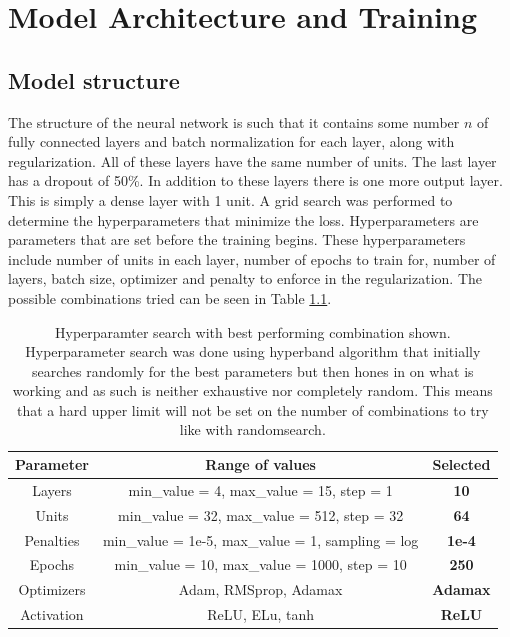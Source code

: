 
\chapter{Model Architecture and Training}

\label{Chapter3}

\section{Model structure}
The structure of the neural network is such that it contains some number $n$ of fully connected layers and batch normalization for each layer, along with regularization. All of these layers have the same number of units. The last layer has a dropout of 50\%. In addition to these layers there is one more output layer. This is simply a dense layer with 1 unit. A grid search was performed to determine the hyperparameters that minimize the loss. Hyperparameters are parameters that are set before the training begins\cite{hyperparameters_definition}. These hyperparameters include number of units in each layer, number of epochs to train for, number of layers, batch size, optimizer and penalty to enforce in the regularization. The possible combinations tried can be seen in Table \ref{table:gridSearchHyperparamters}.

\begin{table}[h]
    \centering
    \caption[Hyperparameter search with best performing combination.]{Hyperparamter search with best performing combination shown. Hyperparameter search was done using hyperband algorithm that initially searches randomly for the best parameters but then hones in on what is working and as such is neither exhaustive nor completely random. This means that a hard upper limit will not be set on the number of combinations to try like with randomsearch.}
    \label{table:gridSearchHyperparamters}
    \begin{tabular}{ccc}
        \toprule
        Parameter & Range of values & Selected\\
        \midrule
        Layers &  min\_value = 4, max\_value = 15, step = 1 & \textbf{10}\\
        Units &  min\_value = 32, max\_value = 512, step = 32 & \textbf{64}\\
        Penalties & min\_value = 1e-5, max\_value = 1, sampling = log & \textbf{1e-4}\\
        Epochs & min\_value = 10, max\_value = 1000, step = 10 & \textbf{250}\\
        Optimizers & Adam, RMSprop, Adamax & \textbf{Adamax}\\
        Activation & ReLU, ELu, tanh & \textbf{ReLU}\\
        \bottomrule
    \end{tabular}
\end{table}

